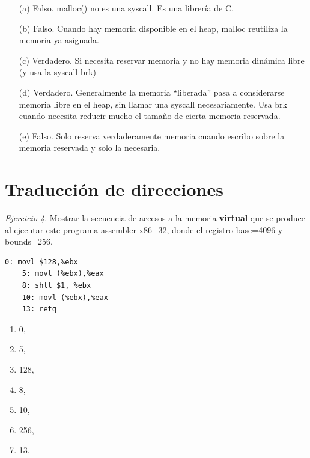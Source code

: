 \documentclass[12pt]{article}
\begin{document}
\begin{rta}
    \begin{itemize}
        \item[(a)] Falso. malloc() no es una syscall. Es una librería de C.
        \item[(b)] Falso. Cuando hay memoria disponible en el heap, malloc reutiliza la memoria ya asignada.
        \item[(c)] Verdadero. Si necesita reservar memoria y no hay memoria dinámica libre (y usa la syscall brk)
        \item[(d)] Verdadero. Generalmente la memoria “liberada” pasa a considerarse memoria libre en el heap, sin llamar una syscall necesariamente. Usa brk cuando necesita reducir mucho el tamaño de cierta memoria reservada.
        \item[(e)] Falso. Solo reserva verdaderamente memoria cuando escribo sobre la memoria reservada y solo la necesaria.
    \end{itemize}
\end{rta}

\section*{Traducción de direcciones}
\noindent \textit{Ejercicio 4}. Mostrar la secuencia de accesos a la memoria \textbf{virtual} que se produce al ejecutar este programa assembler x86\_32, donde el registro base=4096 y bounds=256.
\begin{lstlisting}[style=CStyle]
    0: movl $128,%ebx
    5: movl (%ebx),%eax
    8: shll $1, %ebx
    10: movl (%ebx),%eax
    13: retq
\end{lstlisting}

\begin{rta}
    \begin{enumerate}
        \item 0,
        \item 5,
        \item 128,
        \item 8,
        \item 10,
        \item 256,
        \item 13.
    \end{enumerate}
\end{rta}
\end{document}
